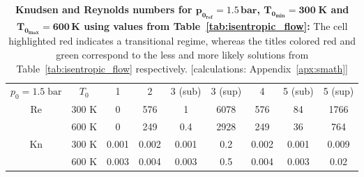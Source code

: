 \begin{table}[H]
    \centering
    \renewcommand{\arraystretch}{1.2}
    \begin{tabular}{|c|c|c|c|c|c|c|c|c|}
    \hline
    \multirow{2}{*}{\small $p_0 = 1.5\;\text{bar}$} 
        & \multirow{2}{*}{$T_0$} 
        & \multirow{2}{*}{1} 
        & \multirow{2}{*}{2} 
        & \multirow{2}{*}{\color{greenColor} 3 (sub)} 
        & \multirow{2}{*}{\color{redColor} 3 (sup)} 
        & \multirow{2}{*}{4} 
        & \multirow{2}{*}{\color{redColor} 5 (sub)} 
        & \multirow{2}{*}{\color{greenColor} 5 (sup)} \\
    & & & & & & & & \\ \hline

    \multirow{2}{*}{Re} 
      & 300 K 
          & 0 
          & 576 
          & 1 
          & \cellcolor[HTML]{FFADA8} 6078 
          & 576
          & 84
          & 1766 \\ \cline{2-9}
      & 600 K 
          & 0
          & 249 
          & 0.4 
          & \cellcolor[HTML]{FFADA8} 2928
          & 249 
          & 36
          & 764 \\ \hline

    \multirow{2}{*}{Kn} 
      & 300 K 
          & 0.001 
          & 0.002
          & 0.001
          & \cellcolor[HTML]{FFADA8} 0.2 
          & 0.002
          & 0.001
          & 0.009 \\ \cline{2-9}
      & 600 K 
          & 0.003 
          & 0.004
          & 0.003
          & \cellcolor[HTML]{FFADA8} 0.5
          & 0.004
          & 0.003
          & 0.02 \\ \hline
    \end{tabular}
    \caption[Knudsen and Reynolds numbers for $p_{0_{ref}} = 1.5\,\mathrm{bar}$, $T_{0_{min}} = 300 \text{K}$ and $T_{0_{max}} 600\,\mathrm{K}$ using values from table~\ref{tab:isentropic_flow}.]{
        \textbf{\textbf{Knudsen and Reynolds numbers for $\mathbf{p_{0_{ref}} = 1.5\,\text{bar}}$, $\mathbf{T_{0_{min}} = 300\;\text{K}}$ and $\mathbf{T_{0_{max}} = 600\,\text{K}}$ using values from Table~\ref{tab:isentropic_flow}:}}
        The cell highlighted red indicates a transitional regime, whereas the titles colored red and green correspond to the less and more likely solutions from Table~\ref{tab:isentropic_flow} respectively.
        [calculations: Appendix~\ref{apx:smath}]
    }
    \label{tab:test-knudsen-reynolds-isentropic}
\end{table}
